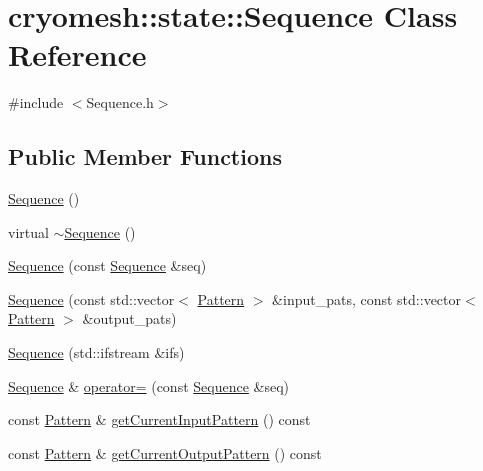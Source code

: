 \hypertarget{classcryomesh_1_1state_1_1Sequence}{\section{cryomesh\-:\-:state\-:\-:\-Sequence \-Class \-Reference}
\label{classcryomesh_1_1state_1_1Sequence}
}


{\ttfamily \#include $<$\-Sequence.\-h$>$}

\subsection*{\-Public \-Member \-Functions}
\begin{DoxyCompactItemize}
\item 
\hyperlink{classcryomesh_1_1state_1_1Sequence_a1d5cb2b54ca31d81b79e6101b572710d}{\-Sequence} ()
\item 
virtual \hyperlink{classcryomesh_1_1state_1_1Sequence_a77f38969fa332873d82db1ddfe4d7e10}{$\sim$\-Sequence} ()
\item 
\hyperlink{classcryomesh_1_1state_1_1Sequence_a73b3fa47233c81ea6814e214ef00d8cd}{\-Sequence} (const \hyperlink{classcryomesh_1_1state_1_1Sequence}{\-Sequence} \&seq)
\item 
\hyperlink{classcryomesh_1_1state_1_1Sequence_adf63898c170a40c957f18d660d889294}{\-Sequence} (const std\-::vector$<$ \hyperlink{classcryomesh_1_1state_1_1Pattern}{\-Pattern} $>$ \&input\-\_\-pats, const std\-::vector$<$ \hyperlink{classcryomesh_1_1state_1_1Pattern}{\-Pattern} $>$ \&output\-\_\-pats)
\item 
\hyperlink{classcryomesh_1_1state_1_1Sequence_a7505ae6753b72c097aa7c99cec2cc936}{\-Sequence} (std\-::ifstream \&ifs)
\item 
\hyperlink{classcryomesh_1_1state_1_1Sequence}{\-Sequence} \& \hyperlink{classcryomesh_1_1state_1_1Sequence_a12470f0672464c288c58616535fef8a6}{operator=} (const \hyperlink{classcryomesh_1_1state_1_1Sequence}{\-Sequence} \&seq)
\item 
const \hyperlink{classcryomesh_1_1state_1_1Pattern}{\-Pattern} \& \hyperlink{classcryomesh_1_1state_1_1Sequence_a58eafb2f3253820c9b8828b801b6d5cb}{get\-Current\-Input\-Pattern} () const 
\item 
const \hyperlink{classcryomesh_1_1state_1_1Pattern}{\-Pattern} \& \hyperlink{classcryomesh_1_1state_1_1Sequence_ac339d8b522a9671b698801d7c46f23f1}{get\-Current\-Output\-Pattern} () const 
\item 

\end{DoxyCompactItemize}
